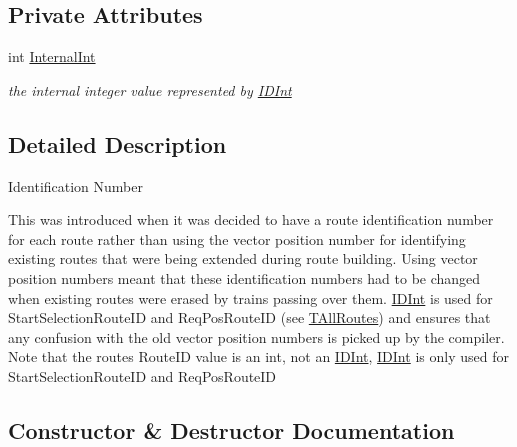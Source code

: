 \subsection*{Private Attributes}
\begin{DoxyCompactItemize}
\item 
\mbox{\label{class_i_d_int_af9b9224cae0ea5f7ce15c83e6b94d00a}} 
int \mbox{\hyperlink{class_i_d_int_af9b9224cae0ea5f7ce15c83e6b94d00a}{Internal\+Int}}
\begin{DoxyCompactList}\small\item\em the internal integer value represented by \mbox{\hyperlink{class_i_d_int}{I\+D\+Int}} \end{DoxyCompactList}\end{DoxyCompactItemize}


\subsection{Detailed Description}
Identification Number

This was introduced when it was decided to have a route identification number for each route rather than using the vector position number for identifying existing routes that were being extended during route building. Using vector position numbers meant that these identification numbers had to be changed when existing routes were erased by trains passing over them. \mbox{\hyperlink{class_i_d_int}{I\+D\+Int}} is used for Start\+Selection\+Route\+ID and Req\+Pos\+Route\+ID (see \mbox{\hyperlink{class_t_all_routes}{T\+All\+Routes}}) and ensures that any confusion with the old vector position numbers is picked up by the compiler. Note that the route\textquotesingle{}s Route\+ID value is an \textquotesingle{}int\textquotesingle{}, not an \textquotesingle{}\mbox{\hyperlink{class_i_d_int}{I\+D\+Int}}\textquotesingle{}, \textquotesingle{}\mbox{\hyperlink{class_i_d_int}{I\+D\+Int}}\textquotesingle{} is only used for Start\+Selection\+Route\+ID and Req\+Pos\+Route\+ID 

\subsection{Constructor \& Destructor Documentation}
\mbox{\label{class_i_d_int_ae51fdc864457738e484bb91c829b082c}} 
